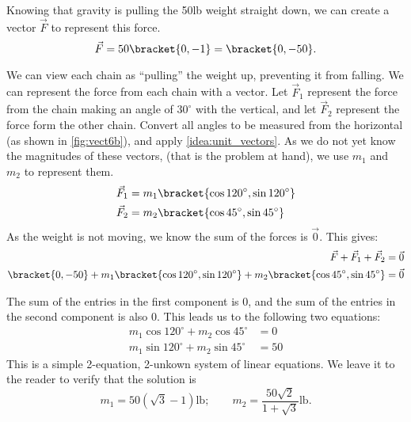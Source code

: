 {Knowing that gravity is pulling the 50lb weight straight down, we can create a vector $\vec F$ to represent this force. 
\[\vec F = 50\bracket{0,-1}=\bracket{0,-50}.\]

We can view each chain as ``pulling'' the weight up, preventing it from falling. We can represent the force from each chain with a vector. Let $\vec F_1$ represent the force from the chain making an angle of $30^\circ$ with the vertical, and let $\vec F_2$ represent the force form the other chain. Convert all angles to be measured from the horizontal (as shown in \autoref{fig:vect6b}), and apply \autoref{idea:unit_vectors}. As we do not yet know the magnitudes of these vectors, (that is the problem at hand), we use $m_1$ and $m_2$ to represent them.
\begin{align*}
\vec F_1 &= m_1\bracket{\cos 120^\circ,\sin120^\circ} \\
\vec F_2 &= m_2\bracket{\cos 45^\circ,\sin45^\circ}
\end{align*}
As the weight is not moving, we know the sum of the forces is $\vec 0$. This gives:
\begin{align*}
\vec F + \vec F_1 + \vec F_2 & = \vec 0\\
\bracket{0,-50}+ m_1\bracket{\cos 120^\circ,\sin120^\circ}+ m_2\bracket{\cos 45^\circ,\sin45^\circ}&=\vec 0
\end{align*}


The sum of the entries in the first component is 0, and the sum of the entries in the second component is also 0. This leads us to the following two equations:
\begin{align*}
m_1\cos120^\circ + m_2\cos45^\circ &=0 \\
m_1\sin120^\circ + m_2\sin45^\circ &=50
\end{align*}
This is a simple 2-equation, 2-unkown system of linear equations. We leave it to the reader to verify that the solution is 
\[
m_1=50(\sqrt{3}-1)\text{lb}%
;\qquad
m_2=\frac{50\sqrt{2}}{1+\sqrt{3}}\text{lb}.%
\]

}
